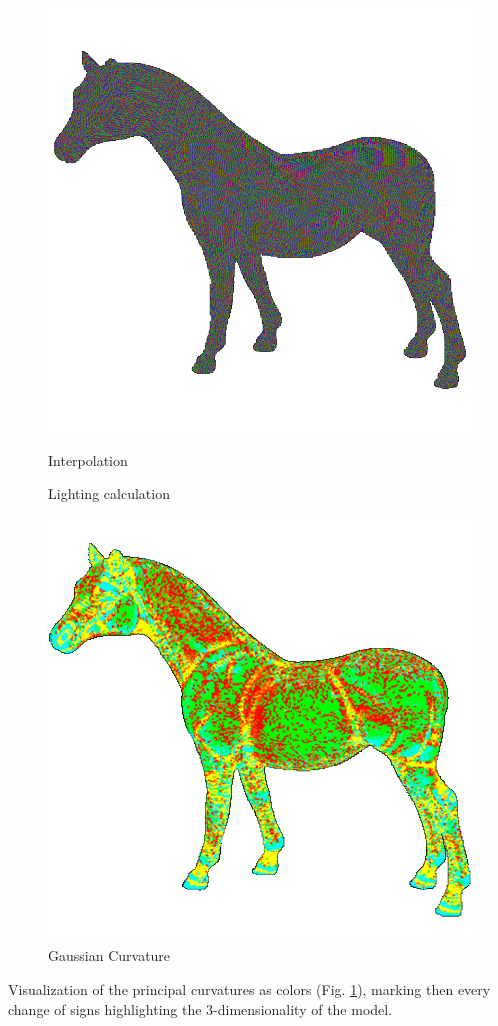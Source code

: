 \begin{figure}[!htb]
    \includegraphics[width=\linewidth]{images/linear-horse.png}
    \caption{Interpolation}\label{fig:interpolation-horse}
  \endminipage\hfill
    \caption{Lighting calculation}\label{fig:lighting-horse}
  \endminipage\hfill
    \includegraphics[width=\linewidth]{images/gaussian-horse.png}
    \caption{Gaussian Curvature}\label{fig:gaussian-horse}
  \endminipage
  \end{figure}
  Visualization of the principal curvatures as colors (Fig. \ref{fig:gaussian-horse}), marking then every change of signs highlighting the 3-dimensionality of the model.
